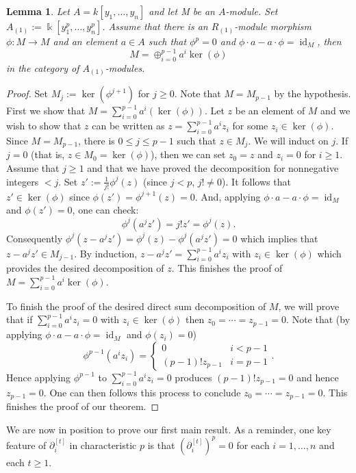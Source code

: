 \documentclass[11pt]{amsart}
\newtheorem{lemma}[theorem]{Lemma}
\theoremstyle{definition}
\theoremstyle{remark}
\numberwithin{equation}{subsection}
\DeclareMathOperator{\id}{id}
\DeclareMathOperator{\kk}{\Bbbk}
\begin{document}
\begin{lemma}
\label{decomposition thm}
Let $A=k[y_1,\dots,y_n]$ and let M be an $A$-module. Set $A_{(1)}:=\kk[y^p_1,\dots,y^p_n]$. Assume that there is an $R_{(1)}$-module morphism $\phi:M\to M$ and an element $a\in A$ such that $\phi^p=0$ and $\phi\cdot a-a\cdot \phi=\id_M$, then 
\[M = \oplus_{i=0}^{p-1}a^i\ker(\phi)\]
in the category of $A_{(1)}$-modules.
\end{lemma}
\begin{proof}
Set $M_j:=\ker(\phi^{j+1})$ for $j\geq 0$. Note that $M=M_{p-1}$ by the hypothesis. First we show that $M=\sum_{i=0}^{p-1}a^i(\ker(\phi))$. Let $z$ be an element of $M$ and we wish to show that $z$ can be written as $z=\sum_{i=0}^{p-1}a^iz_i$ for some $z_i\in \ker(\phi)$. Since $M=M_{p-1}$, there is $0\leq j\leq p-1$ such that $z\in M_j$. We will induct on $j$. If $j=0$ (that is, $z\in M_0=\ker(\phi)$), then we can set $z_0=z$ and $z_i=0$ for $i\geq 1$. Assume that $j\geq 1$ and that we have proved the decomposition for nonnegative integers $<j$. Set $z':=\frac{1}{j!}\phi^j(z)$ (since $j<p$, $j!\neq 0$). It follows that $z'\in \ker(\phi)$ since $\phi(z')=\phi^{j+1}(z)=0$. And, applying $\phi\cdot a-a\cdot \phi=\id_M$ and $\phi(z')=0$, one can check:
\[\phi^j(a^jz')=j!z'=\phi^j(z).\]
Consequently $\phi^j(z-a^jz')=\phi^j(z)-\phi^j(a^jz')=0$ which implies that $z-a^jz'\in M_{j-1}$. By induction, $z-a^jz'=\sum_{i=0}^{p-1}a^iz_i$ with $z_i\in \ker(\phi)$ which provides the desired decomposition of $z$. This finishes the proof of $M=\sum_{i=0}^{p-1}a^i\ker(\phi)$.

To finish the proof of the desired direct sum decomposition of $M$, we will prove that if $\sum_{i=0}^{p-1}a^iz_i=0$ with $z_i\in \ker(\phi)$ then $z_0=\cdots=z_{p-1}=0$. Note that (by applying $\phi\cdot a-a\cdot \phi=\id_M$ and $\phi(z_i)=0$)
\[\phi^{p-1}(a^iz_i)=\begin{cases} 0 & i<p-1\\ (p-1)!z_{p-1} & i=p-1\end{cases}.\] 
Hence applying $\phi^{p-1}$ to $\sum_{i=0}^{p-1}a^iz_i=0$ produces $(p-1)!z_{p-1}=0$ and hence $z_{p-1}=0$. One can then follows this process to conclude $z_0=\cdots=z_{p-1}=0$. This finishes the proof of our theorem.
\end{proof}

We are now in position to prove our first main result. As a reminder, one key feature of $\partial^{[t]}_i$ in characteristic $p$ is that $(\partial^{[t]}_i)^p=0$ for each $i=1,\dots,n$ and each $t\geq 1$.
\end{document}
